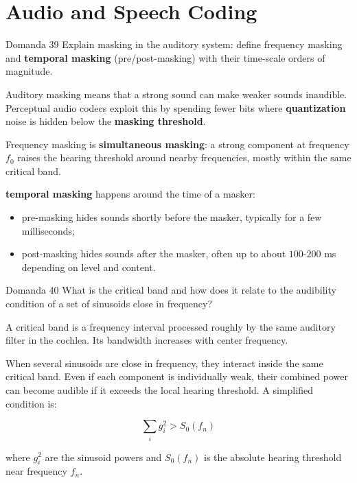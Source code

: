 \section{Audio and Speech Coding}




\begin{questionbox}{Domanda 39}
Explain masking in the auditory system: define frequency masking and \textbf{temporal masking} (pre/post-masking) with their time-scale orders of magnitude.
\end{questionbox}


Auditory masking means that a strong sound can make weaker sounds inaudible. Perceptual audio codecs exploit this by spending fewer bits where \textbf{quantization} noise is hidden below the \textbf{masking threshold}.

Frequency masking is \textbf{simultaneous masking}: a strong component at frequency $f_0$ raises the hearing threshold around nearby frequencies, mostly within the same critical band.

\textbf{temporal masking} happens around the time of a masker:

\begin{itemize}
  \item pre-masking hides sounds shortly before the masker, typically for a few milliseconds;
  \item post-masking hides sounds after the masker, often up to about $100$-$200$ ms depending on level and content.
\end{itemize}



\begin{questionbox}{Domanda 40}
What is the critical band and how does it relate to the audibility condition of a set of sinusoids close in frequency?
\end{questionbox}


A critical band is a frequency interval processed roughly by the same auditory filter in the cochlea. Its bandwidth increases with center frequency.

When several sinusoids are close in frequency, they interact inside the same critical band. Even if each component is individually weak, their combined power can become audible if it exceeds the local hearing threshold. A simplified condition is:


$$
\sum_i g_i^2 > S_0(f_n)
$$


where $g_i^2$ are the sinusoid powers and $S_0(f_n)$ is the absolute hearing threshold near frequency $f_n$.



